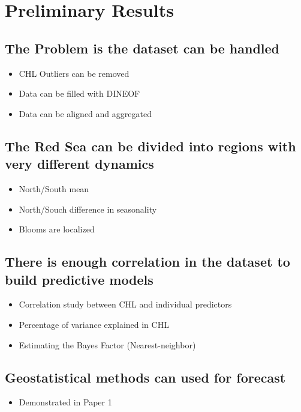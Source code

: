\chapter{Preliminary Results}

\section{The Problem is the dataset can be handled}

\begin{itemize}
\item CHL Outliers can be removed
\item Data can be filled with DINEOF
\item Data can be aligned and aggregated
\end{itemize}

\section{The Red Sea can be divided into regions with very different dynamics}

\begin{itemize}
\item North/South mean
\item North/Souch difference in seasonality 
\item Blooms are localized
\end{itemize}

\section{There is enough correlation in the dataset to build predictive models}

\begin{itemize}
\item Correlation study between CHL and individual predictors
\item Percentage of variance explained in CHL
\item Estimating the Bayes Factor (Nearest-neighbor)
\end{itemize}

\section{Geostatistical methods can used for forecast}

\begin{itemize}
\item Demonstrated in Paper 1
\end{itemize}
